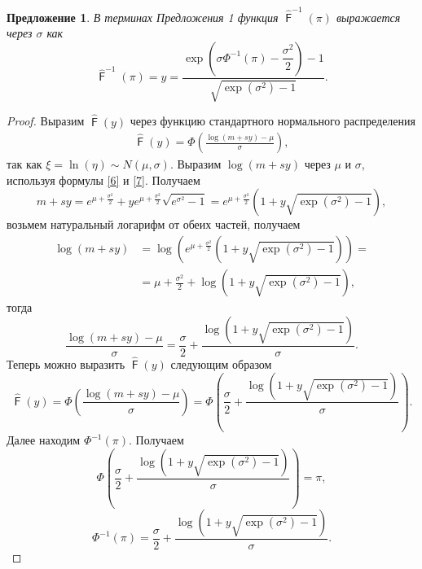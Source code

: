 \documentclass[specialist, substylefile = spbu.rtx,
subf,href,colorlinks=true, 12pt]{disser}
\newtheorem{proposition}[theorem]{Предложение}
\DeclareMathOperator{\F}{\mathsf{F}}
\begin{document}
	\begin{proposition}\label{pr4}
		В терминах Предложения 1 функция $\hat{\F}^{-1}(\pi)$ выражается через $\sigma$ как
		\begin{equation}
			\displaystyle{\hat{\F}^{-1}(\pi) = y = \frac{\exp\left( \sigma\Phi^{-1}(\pi) - \dfrac{\sigma^{2} }{2}\right) -1}{\sqrt{\exp(\sigma ^{2})-1}}}. \label{13}
		\end{equation}
	\end{proposition}
	\begin{proof}
		Выразим $\hat{\F}(y)$ через функцию стандартного нормального распределения 
		\begin{align*}
			\hat{\F}(y)=\Phi \left(\frac{\log(m+sy) - \mu}{\sigma}\right),
		\end{align*}
		так как $\xi=\ln(\eta) \sim N(\mu, \sigma).$
		Выразим $\log(m+sy)$ через $\mu$ и $\sigma$, используя формулы \eqref{6} и \eqref{7}. Получаем 
		\begin{equation*}
			m+sy = e^{\mu +\frac{\sigma ^{2}}{2}} + ye^{\mu +\frac{\sigma ^{2}}{2}}\sqrt{e^{\sigma ^{2}}-1} = e^{\mu +\frac{\sigma ^{2}}{2}}(1+y\sqrt{\exp(\sigma ^{2})-1}),
		\end{equation*}
		возьмем натуральный логарифм от обеих частей, получаем
		\begin{align*}
			\log(m+sy) &= \log(e^{\mu +\frac{\sigma ^{2}}{2}}(1+y\sqrt{\exp(\sigma ^{2})-1})) =\\
			&=\mu +\frac{\sigma ^{2}}{2} + \log(1+y\sqrt{\exp(\sigma ^{2})-1}),
		\end{align*}
		тогда
		\begin{equation*}
			\displaystyle{\frac{\log(m+sy)-\mu }{\sigma } = \frac{\sigma }{2} + \frac{\log(1+y\sqrt{\exp(\sigma ^{2})-1})}{\sigma}}.
		\end{equation*}
		Теперь можно выразить $\hat{\F}(y)$ следующим образом
		\begin{equation*}
			\displaystyle{\hat{\F}(y) = \Phi \left(\frac{\log(m+sy)-\mu }{\sigma }\right) = \Phi \left(\frac{\sigma }{2} + \frac{\log(1+y\sqrt{\exp(\sigma ^{2})-1})}{\sigma}\right)}.
		\end{equation*}
		Далее находим $\Phi^{-1}(\pi)$. Получаем 
		\begin{equation*}
			\displaystyle{\Phi \left(\frac{\sigma }{2} + \frac{\log(1+y\sqrt{\exp(\sigma ^{2})-1})}{\sigma }\right) = \pi},
		\end{equation*}
		\begin{equation*}
			\displaystyle{\Phi^{-1}(\pi)=\frac{\sigma }{2} + \frac{\log(1+y\sqrt{\exp(\sigma ^{2})-1})}{\sigma}}.

\end{equation*}
\end{proof}
\end{document}
